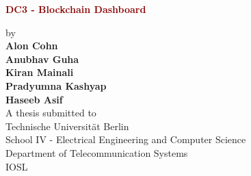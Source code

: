 \begin{titlepage}
	\strut
	\hfill
	\begin{center}
	\vspace{1cm}
		\Huge
		\begin{spacing}{.9}
			\textcolor{DarkRed}{\textbf{DC3 - Blockchain Dashboard}}\\
		\end{spacing}
		\vspace{0.8cm}
		\large
		by\\
		\vspace{0.8cm}
		\textbf{Alon Cohn}\\
		\textbf{Anubhav Guha}\\
		\textbf{Kiran Mainali }\\
		\textbf{Pradyumna Kashyap}\\
		\textbf{Haseeb Asif}\\
		\vspace{0.8cm}
		\vspace{2cm}
	 	A thesis submitted to\\
		\vspace{0.5cm}
		Technische Universität Berlin\\
		School IV - Electrical Engineering and Computer Science\\
		Department of Telecommunication Systems\\
		IOSL\\

\end{center}
\end{titlepage}
